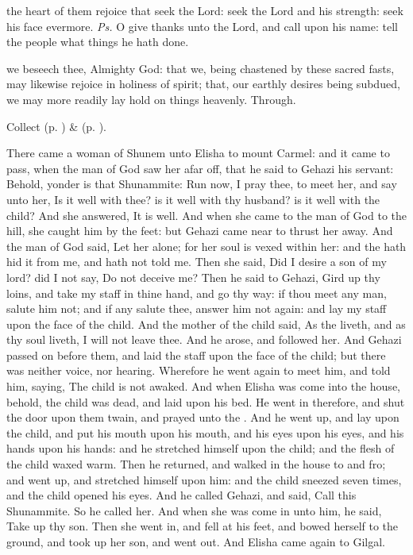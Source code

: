 \introit
{} the heart of them rejoice that seek the Lord: seek the Lord and his strength: seek his face evermore. \textit{Ps.} O give thanks unto the Lord, and call upon his name: tell the people what things he hath done.

\collect
{} we beseech thee, Almighty God: that we, being chastened by these sacred fasts, may likewise rejoice in holiness of spirit; that, our earthly desires being subdued, we may more readily lay hold on things heavenly. Through.
\begin{rubric}
     Collect  (p. \pageref{AshWednesdayMassCollect}) \&   (p. \pageref{SPLivingDeparted}).
\end{rubric}


 There came a woman of Shunem unto Elisha to mount Carmel: and it came to pass, when the man of God saw her afar off, that he said to Gehazi his servant: Behold, yonder is that Shunammite: Run now, I pray thee, to meet her, and say unto her, Is it well with thee? is it well with thy husband? is it well with the child? And she answered, It is well. And when she came to the man of God to the hill, she caught him by the feet: but Gehazi came near to thrust her away. And the man of God said, Let her alone; for her soul is vexed within her: and the  hath hid it from me, and hath not told me. Then she said, Did I desire a son of my lord? did I not say, Do not deceive me? Then he said to Gehazi, Gird up thy loins, and take my staff in thine hand, and go thy way: if thou meet any man, salute him not; and if any salute thee, answer him not again: and lay my staff upon the face of the child. And the mother of the child said, As the  liveth, and as thy soul liveth, I will not leave thee. And he arose, and followed her. And Gehazi passed on before them, and laid the staff upon the face of the child; but there was neither voice, nor hearing. Wherefore he went again to meet him, and told him, saying, The child is not awaked. And when Elisha was come into the house, behold, the child was dead, and laid upon his bed. He went in therefore, and shut the door upon them twain, and prayed unto the . And he went up, and lay upon the child, and put his mouth upon his mouth, and his eyes upon his eyes, and his hands upon his hands: and he stretched himself upon the child; and the flesh of the child waxed warm. Then he returned, and walked in the house to and fro; and went up, and stretched himself upon him: and the child sneezed seven times, and the child opened his eyes. And he called Gehazi, and said, Call this Shunammite. So he called her. And when she was come in unto him, he said, Take up thy son. Then she went in, and fell at his feet, and bowed herself to the ground, and took up her son, and went out. And Elisha came again to Gilgal.

